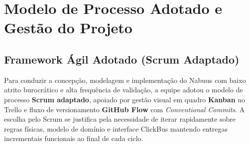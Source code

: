 \documentclass[12pt, a4paper]{article}
\begin{document}
\section{Modelo de Processo Adotado e Gestão do Projeto}

\subsection{Framework Ágil Adotado (Scrum Adaptado)}
Para conduzir a concepção, modelagem e implementação do Nabuus com baixo atrito burocrático e alta frequência de validação, a equipe adotou o modelo de processo \textbf{Scrum adaptado}, apoiado por gestão visual em quadro \textbf{Kanban} no Trello e fluxo de versionamento \textbf{GitHub Flow} com \textit{Conventional Commits}. A escolha pelo Scrum se justifica pela necessidade de iterar rapidamente sobre regras físicas, modelo de domínio e interface ClickBus mantendo entregas incrementais funcionais ao final de cada ciclo.
\end{document}
